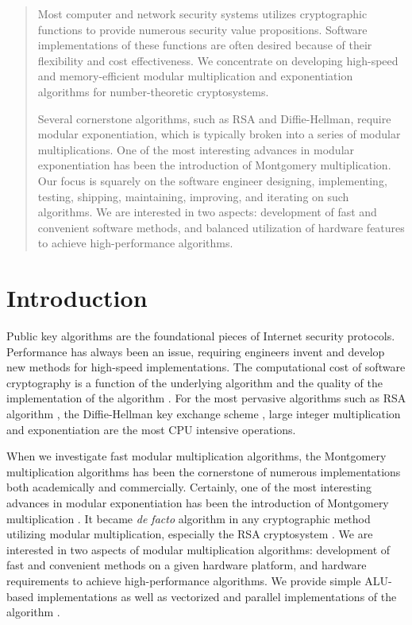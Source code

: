 \documentclass[twocolumn]{svjour3}          %
\begin{document}
\begin{abstract}

Most computer and network security systems utilizes cryptographic functions
to provide numerous security value propositions.
Software implementations of these functions
are often desired because of their flexibility and cost effectiveness.
We concentrate on developing high-speed and memory-efficient modular
multiplication and exponentiation algorithms for number-theoretic
cryptosystems.

Several cornerstone algorithms, such as RSA and Diffie-Hellman, require
modular exponentiation, which is typically broken into a series of
modular multiplications.  One of the most interesting advances in
modular exponentiation has been the introduction of Montgomery
multiplication. Our focus is squarely on the software engineer designing,
implementing, testing, shipping, maintaining, improving, and iterating on such algorithms.
We are interested in two aspects: development of fast and convenient software
methods, and balanced utilization of hardware features to achieve
high-performance algorithms.

\end{abstract}


\section{Introduction}
\label{introduction}

Public key algorithms are the foundational pieces of Internet security
protocols. Performance has always been an issue, requiring engineers
invent and develop new methods for high-speed implementations.  The
computational cost of software cryptography is a function of the
underlying algorithm and the quality of the implementation of the
algorithm \cite{RC93:A}. For the most pervasive algorithms such as RSA
algorithm \cite{RSA78:A}, the Diffie-Hellman key exchange scheme
\cite{DH76:New}, large integer multiplication and exponentiation are
the most CPU intensive operations.

When we investigate fast modular multiplication algorithms, the
Montgomery multiplication algorithms has been the cornerstone of
numerous implementations both academically and commercially.
Certainly, one of the most interesting advances in modular
exponentiation has been the introduction of Montgomery multiplication
\cite{M85:Modular}.  It became {\em de facto} algorithm in any
cryptographic method utilizing modular multiplication, especially the
RSA cryptosystem \cite{AKP96:Public,BK95:Fast}.  We are interested in
two aspects of modular multiplication algorithms: development of fast
and convenient methods on a given hardware platform, and hardware
requirements to achieve high-performance algorithms.
We provide simple ALU-based implementations as well as
vectorized and parallel implementations of the algorithm \cite{GK12:Software,PS04:Parallel}.
\end{document}
